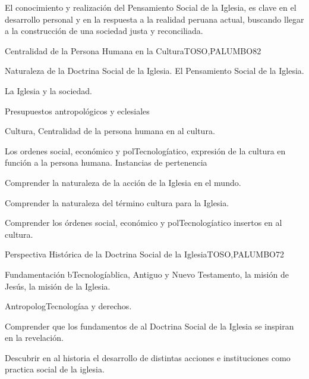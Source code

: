 \begin{syllabus}


\begin{justification}
El conocimiento y realización del Pensamiento Social de la Iglesia, es clave en el desarrollo personal 
y en la respuesta a la realidad peruana actual, buscando llegar a la construcción de una 
sociedad justa y reconciliada.
\end{justification}

\begin{goals}
\item \OutcomeFH
\end{goals}

\begin{outcomes}
\end{outcomes}

\begin{unit}{Centralidad de la Persona Humana en la Cultura}{TOSO,PALUMBO}{8}{2}
\begin{topics}
	\item Naturaleza de la Doctrina Social de la Iglesia.  El Pensamiento Social de la Iglesia.
	\item La Iglesia y la sociedad.
	\item Presupuestos antropológicos y eclesiales
	\item Cultura, Centralidad de la persona humana en al cultura.
	\item Los ordenes social, económico y polTecnologíatico, expresión de la cultura en función a la persona humana.  Instancias de pertenencia
\end{topics}
\begin{unitgoals}
	\item Comprender la naturaleza de la acción de la Iglesia en el mundo.
	\item Comprender la naturaleza del término cultura para la Iglesia.
	\item Comprender los órdenes social, económico y polTecnologíatico insertos en al cultura.
\end{unitgoals}
\end{unit}

\begin{unit}{Perspectiva Histórica de la Doctrina Social de la Iglesia}{TOSO,PALUMBO}{7}{2}
\begin{topics}
	\item Fundamentación bTecnologíablica, Antiguo y Nuevo Testamento, la misión de Jesús, la misión de la Iglesia.
	\item AntropologTecnologíaa y derechos.
\end{topics}
\begin{unitgoals}
	\item Comprender que los fundamentos de al Doctrina Social de la Iglesia se inspiran en la revelación.
	\item Descubrir en al historia el desarrollo de distintas acciones e instituciones como practica social de la iglesia.
\end{unitgoals}
\end{unit}


\end{syllabus}
